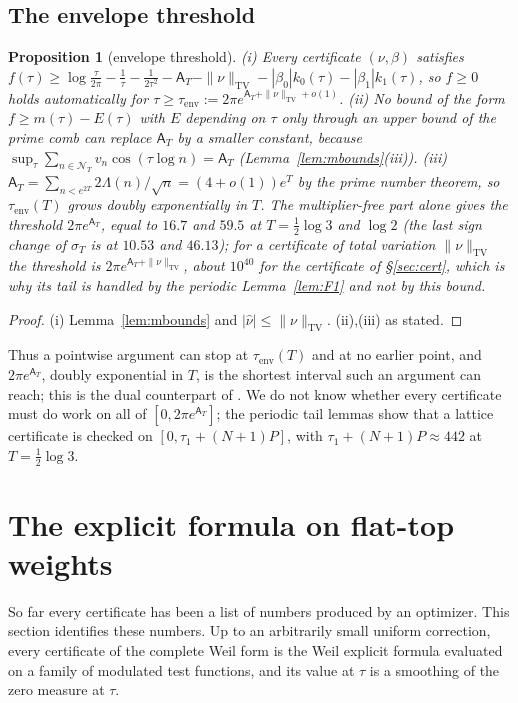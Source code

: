 \documentclass[11pt]{amsart}
\newtheorem{proposition}[theorem]{Proposition}
\theoremstyle{definition}
\theoremstyle{remark}
\newcommand{\TV}{\operatorname{TV}}
\newcommand{\sT}{\sigma_T}
\newcommand{\nuh}{\widehat\nu}
\newcommand{\NT}{\mathcal N_T}
\newcommand{\Aconst}{\mathsf A_T}
\begin{document}
\subsection{The envelope threshold}

\begin{proposition}[envelope threshold]\label{prop:env}
\emph{(i)} Every certificate $(\nu,\beta)$ satisfies $f(\tau)\ge\log\frac\tau{2\pi}-\frac1\tau-\frac1{2\tau^2}-\Aconst-\|\nu\|_{\TV}-|\beta_0|k_0(\tau)-|\beta_1|k_1(\tau)$,
so $f\ge0$ holds automatically for $\tau\ge\tau_{\mathrm{env}}:=2\pi e^{\Aconst+\|\nu\|_{\TV}+o(1)}$.
\emph{(ii)} No bound of the form $f\ge m(\tau)-E(\tau)$ with $E$ depending on $\tau$ only through
an upper bound of the prime comb can replace $\Aconst$ by a smaller constant, because
$\sup_\tau\sum_{n\in\NT}v_n\cos(\tau\log n)=\Aconst$ (Lemma~\ref{lem:mbounds}(iii)).
\emph{(iii)} $\Aconst=\sum_{n<e^{2T}}2\Lambda(n)/\sqrt n=(4+o(1))e^{T}$ by the prime number theorem,
so $\tau_{\mathrm{env}}(T)$ grows doubly exponentially in $T$. The multiplier-free part alone gives
the threshold $2\pi e^{\Aconst}$, equal to $16.7$ and $59.5$ at $T=\frac12\log3$ and $\log2$ (the last
sign change of $\sT$ is at $10.53$ and $46.13$); for a certificate of total variation $\|\nu\|_{\TV}$
the threshold is $2\pi e^{\Aconst+\|\nu\|_{\TV}}$, about $10^{40}$ for the certificate of
\S\ref{sec:cert}, which is why its tail is handled by the periodic Lemma~\ref{lem:F1} and not by this
bound.
\end{proposition}
\begin{proof}
(i) Lemma~\ref{lem:mbounds} and $|\nuh|\le\|\nu\|_{\TV}$. (ii),(iii) as stated.
\end{proof}

Thus a pointwise argument can stop at $\tau_{\mathrm{env}}(T)$ and at no earlier point, and
$2\pi e^{\Aconst}$, doubly exponential in $T$, is the shortest interval such an argument can
reach; this is the dual counterpart of \cite[Thm.~1.4]{Zhu2026}. We do not know whether every
certificate must do work on all of $[0,2\pi e^{\Aconst}]$; the periodic tail lemmas show that a
lattice certificate is checked on $[0,\tau_1+(N+1)P]$, with $\tau_1+(N+1)P\approx442$ at $T=\frac12\log3$.

\section{The explicit formula on flat-top weights}\label{sec:Z}

So far every certificate has been a list of numbers produced by an optimizer. This section
identifies these numbers. Up to an arbitrarily small uniform correction, every certificate of the
complete Weil form is the Weil explicit formula evaluated on a family of modulated test functions,
and its value at $\tau$ is a smoothing of the zero measure at $\tau$.
\end{document}
